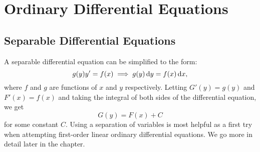 \chapter{Ordinary Differential Equations}
\section{Separable Differential Equations}

A separable differential equation can be simplified to the form:
$$g(y)y'=f(x) \implies g(y)\dif y = f(x) \dif x,$$
where $f$ and $g$ are functions of $x$ and $y$ respectively. Letting
$G'(y)=g(y)$ and $F'(x)=f(x)$ and taking the integral of both sides of the
differential equation, we get $$G(y) = F(x)+C$$ for some constant $C$. Using
a separation of variables is most helpful as a first try when attempting
first-order linear ordinary differential equations. We go more in detail later
in the chapter.


